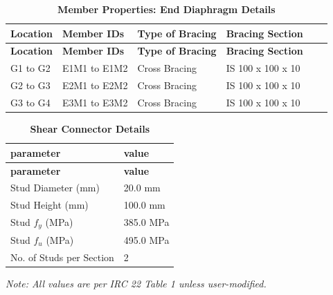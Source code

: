 \documentclass[12pt,a4paper]{report}
\newcommand{\ReportCompactTable}{\setlength{\tabcolsep}{3.5pt}}
\newcommand{\ReportLeftAlignedLongTable}{\setlength{\LTleft}{0pt}\setlength{\LTright}{\fill}}
\numberwithin{table}{chapter}
\numberwithin{figure}{chapter}
\begin{document}
\vspace{0.4em}
\noindent
\ReportCompactTable
\ReportLeftAlignedLongTable

\begin{longtable}{|L{2.2cm}|L{2.2cm}|L{3.0cm}|L{2.5cm}|C{1.8cm}|C{1.8cm}|}
\caption{\textbf{Member Properties: End Diaphragm Details}}
\hline
\textbf{Location} & \textbf{Member IDs} & \textbf{Type of Bracing} & \textbf{Bracing Section} \\
\hline
\endfirsthead
\textbf{Location} & \textbf{Member IDs} & \textbf{Type of Bracing} & \textbf{Bracing Section} \\
\hline
\endhead
G1 to G2 & E1M1 to E1M2 & Cross Bracing & IS 100 x 100 x 10 \\[6pt]
\hline
G2 to G3 & E2M1 to E2M2 & Cross Bracing & IS 100 x 100 x 10 \\[6pt]
\hline
G3 to G4 & E3M1 to E3M2 & Cross Bracing & IS 100 x 100 x 10 \\[6pt]
\hline
\end{longtable}



\label{subsec:shear-connectors}

\vspace{2.2em}

\vspace{0.4em}
\begin{longtable}{|L{5.5cm}|p{10.0cm}|}
\caption{\textbf{Shear Connector Details}}
\hline
\textbf{parameter} & \textbf{value} \\
\hline
\endfirsthead
\textbf{parameter} & \textbf{value} \\
\hline
\endhead
\textnormal{Stud Diameter (mm)} & 20.0 mm \\[6pt]
\hline
\textnormal{Stud Height (mm)} & 100.0 mm \\[6pt]
\hline
\textnormal{Stud $f_y$ (MPa)} & 385.0 MPa \\[6pt]
\hline
\textnormal{Stud $f_u$ (MPa)} & 495.0 MPa \\[6pt]
\hline
\textnormal{No. of Studs per Section} & 2 \\[6pt]
\hline
\end{longtable}



\label{subsec:safety-factors}

\vspace{2.2em}

\vspace{0.3em}
\noindent\textit{Note: All values are per IRC 22 Table 1 unless user-modified.}
\end{document}
